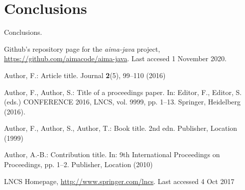 \documentclass[11pt]{llncs}
\begin{document}
\section{Conclusions}\label{conclusions}
Conclusions.
\begin{thebibliography}{8}
Github's repository page for the \textit{aima-java} project, \url{https://github.com/aimacode/aima-java}. Last accesed 1 November 2020.

Author, F.: Article title. Journal \textbf{2}(5), 99--110 (2016)

Author, F., Author, S.: Title of a proceedings paper. In: Editor,
F., Editor, S. (eds.) CONFERENCE 2016, LNCS, vol. 9999, pp. 1--13.
Springer, Heidelberg (2016). 

Author, F., Author, S., Author, T.: Book title. 2nd edn. Publisher,
Location (1999)

Author, A.-B.: Contribution title. In: 9th International Proceedings
on Proceedings, pp. 1--2. Publisher, Location (2010)

LNCS Homepage, \url{http://www.springer.com/lncs}. Last accessed 4
Oct 2017
\end{thebibliography}
\end{document}
